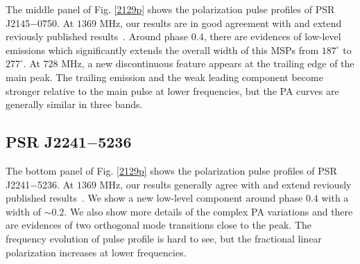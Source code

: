 \documentclass[useAMS,usenatbib]{mn2e}
\begin{document}
The middle panel of Fig. \ref{2129p} shows the polarization pulse profiles of 
PSR J2145$-$0750.
%
At $1369$ MHz, our results are in good agreement with and extend reviously 
published results~\citep{Yan11}.
%
Around phase $0.4$, there are evidences of low-level emissions which 
significantly extends the overall width of this MSPs from $187^{\circ}$ to 
$277^{\circ}$.
%
At $728$ MHz, a new discontinuous feature appears at the trailing edge of 
the main peak. 
%
The trailing emission and the weak leading component become stronger relative 
to the main pulse at lower frequencies, but the PA curves are generally similar 
in three bands.


\subsection{PSR J2241$-$5236}

The bottom panel of Fig. \ref{2129p} shows the polarization pulse profiles of 
PSR J2241$-$5236.
%
At $1369$ MHz, our results generally agree with and extend reviously published 
results~\citep{Keith11}.
%
We show a new low-level component around phase $0.4$ with a width of $\sim 0.2$.
%
We also show more details of the complex PA variations and there are evidences 
of two orthogonal mode transitions close to the peak.
%
The frequency evolution of pulse profile is hard to see, but the fractional 
linear polarization increases at lower frequencies.


\end{document}
